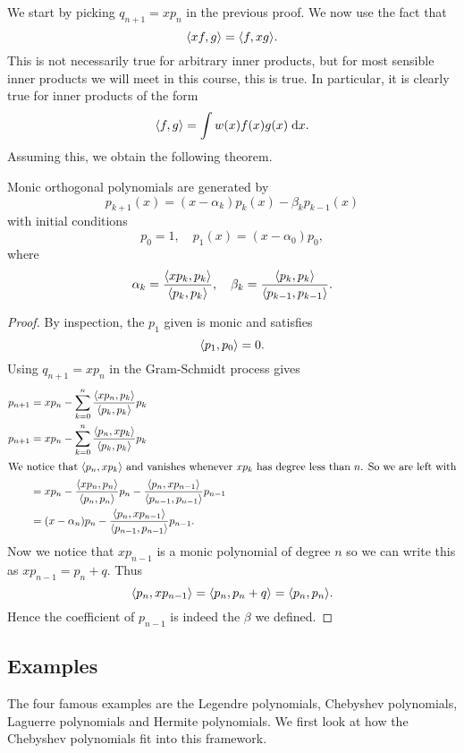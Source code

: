 \documentclass[a4paper]{article}
\begin{document}
We start by picking $q_{n + 1} = xp_n$ in the previous proof. We now use the fact that
\[
  \langle xf, g\rangle = \langle f, xg\rangle.
\]
This is not necessarily true for arbitrary inner products, but for most sensible inner products we will meet in this course, this is true. In particular, it is clearly true for inner products of the form
\[
  \langle f, g\rangle = \int w(x) f(x) g(x)\;\mathrm{d} x.
\]
Assuming this, we obtain the following theorem.
\begin{thm}
  Monic orthogonal polynomials are generated by
  \[
    p_{k + 1}(x) = (x - \alpha_k)p_k(x) - \beta_k p_{k - 1}(x)
  \]
  with initial conditions
  \[
    p_0 = 1,\quad p_1(x) = (x - \alpha_0) p_0,
  \]
  where
  \[
    \alpha_k = \frac{\langle x p_k, p_k\rangle}{\langle p_k, p_k\rangle},\quad \beta_k = \frac{\langle p_k, p_k\rangle}{\langle p_{k - 1}, p_{k - 1}\rangle}.
  \]
\end{thm}

\begin{proof}
  By inspection, the $p_1$ given is monic and satisfies
  \[
    \langle p_1, p_0\rangle = 0.
  \]
  Using $q_{n + 1} = x p_n$ in the Gram-Schmidt process gives
  \begin{align*}
    p_{n + 1} &= xp_n - \sum_{k = 0}^n \frac{\langle x p_n, p_k\rangle}{\langle p_k, p_k\rangle} p_k\\
    p_{n + 1} &= xp_n - \sum_{k = 0}^n \frac{\langle p_n, x p_k\rangle}{\langle p_k, p_k\rangle} p_k\\
    \intertext{We notice that $\langle p_n, xp_k\rangle$ and vanishes whenever $x p_k$ has degree less than $n$. So we are left with}
    &= xp_n - \frac{\langle x p_n, p_n\rangle}{\langle p_n, p_n\rangle}p_n - \frac{\langle p_n, xp_{n - 1}\rangle}{\langle p_{n - 1}, p_{n - 1}\rangle} p_{n - 1}\\
    &= (x - \alpha_n) p_n - \frac{\langle p_n, xp_{n - 1}\rangle}{\langle p_{n - 1}, p_{n - 1}\rangle} p_{n - 1}.
  \end{align*}
  Now we notice that $xp_{n - 1}$ is a monic polynomial of degree $n$ so we can write this as $x p_{n - 1} = p_n + q$. Thus
  \[
    \langle p_n, xp_{n - 1}\rangle = \langle p_n, p_n + q\rangle = \langle p_n, p_n\rangle.
  \]
  Hence the coefficient of $p_{n - 1}$ is indeed the $\beta$ we defined.
\end{proof}

\subsection{Examples}
The four famous examples are the Legendre polynomials, Chebyshev polynomials, Laguerre polynomials and Hermite polynomials. We first look at how the Chebyshev polynomials fit into this framework.
\end{document}
